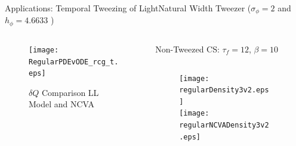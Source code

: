 \begin{frame}[c]{Applications: Temporal Tweezing of Light}{\textcolor{paleblue}{Natural Width Tweezer} ($\sigma_\phi = 2$ and $h_\phi  = 4.6633$ )}

\begin{columns}

\begin{column}{0.28\textwidth}

\vspace{-7em}
\begin{framed}
\vspace{-1em}
\begin{figure}[h]
\centering
\centerline{\texttt{[image: RegularPDEvODE\_rcg\_t.eps]}\hspace*{0cm}}
\caption{\tiny $\delta Q$ Comparison LL Model and NCVA}
\end{figure}
\vspace{-1em}
\end{framed}
\end{column}
\vrule width 1pt

\begin{column}{0.75\textwidth}
\vspace{-0.5em}
\centering
{\small Non-Tweezed CS:  $\tau_f =12$, $\beta = 10$ }
\vspace{0.5em}
\begin{columns}
\begin{column}{0.5\textwidth}
\vspace{-1em}
\begin{figure}
\hspace{2em}\texttt{[image: regularDensity3v2.eps]}  \\
\vspace{-0.5em}
\hspace{2em}\texttt{[image: regularNCVADensity3v2.eps]} 
\end{figure}
\end{column}
\begin{column}{0.5\textwidth}
\vspace{-0.5em} \raggedright
\hspace{-2em}%
\end{column}
\end{columns}
\vspace{0.5em}


\end{column}
\end{columns}
\end{frame}
